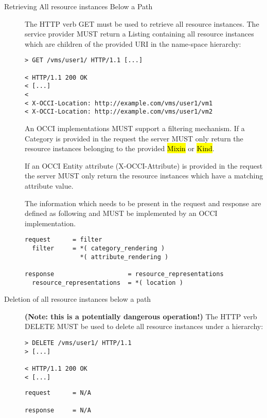 \documentclass[10pt,a4paper]{article}
\begin{document}
\begin{description}
  \item[Retrieving All resource instances Below a Path] The HTTP verb
    GET must be used to retrieve all resource instances. The service
    provider MUST return a Listing containing all resource instances
    which are children of the provided URI in the name-space
    hierarchy:

\begin{verbatim}
> GET /vms/user1/ HTTP/1.1 [...]
 
< HTTP/1.1 200 OK
< [...]
< 
< X-OCCI-Location: http://example.com/vms/user1/vm1
< X-OCCI-Location: http://example.com/vms/user1/vm2
\end{verbatim}

    An OCCI implementations MUST support a filtering mechanism. If a
    Category is provided in the request the server MUST only return
    the resource instances belonging to the provided \hl{Mixin} or
    \hl{Kind}.

    If an OCCI Entity attribute (X-OCCI-Attribute) is provided in the
    request the server MUST only return the resource instances which
    have a matching attribute value.

    The information which needs to be present in the request and
    response are defined as following and MUST be implemented by an
    OCCI implementation.

\begin{verbatim}
request      = filter
  filter     = *( category_rendering )
               *( attribute_rendering )

response                    = resource_representations
  resource_representations  = *( location ) 
\end{verbatim}

  \item[Deletion of all resource instances below a path]
    \textbf{(Note: this is a potentially dangerous operation!)} The
    HTTP verb DELETE MUST be used to delete all resource instances
    under a hierarchy:
\begin{verbatim}
> DELETE /vms/user1/ HTTP/1.1
> [...]
 
< HTTP/1.1 200 OK
< [...]
\end{verbatim}

\begin{verbatim}
request      = N/A

response     = N/A
\end{verbatim}

\end{description}
\end{document}
